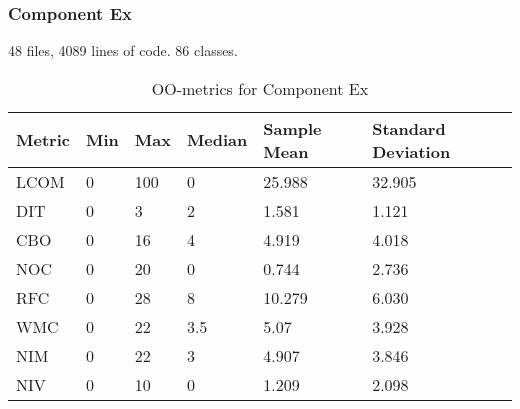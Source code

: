 \subsubsection{Component Ex}
48 files, 4089 lines of code. 86 classes.
\begin{table}[]
\centering
\caption{OO-metrics for Component Ex}
\label{tab:oometrics-ex}
\begin{tabular}{|l|l|l|l|l|l|}
\hline
\textbf{Metric} & \textbf{Min} & \textbf{Max} & \textbf{Median} & \textbf{Sample Mean} & \textbf{Standard Deviation} \\ \hline
LCOM            & 0           & 100          & 0               & 25.988               & 32.905                      \\ \hline
DIT             & 0            & 3            & 2               & 1.581                & 1.121                       \\ \hline
CBO             & 0            & 16           & 4               & 4.919                & 4.018                       \\ \hline
NOC             & 0            & 20           & 0               & 0.744                & 2.736                       \\ \hline
RFC             & 0            & 28           & 8               & 10.279               & 6.030                       \\ \hline
WMC             & 0            & 22           & 3.5             & 5.07                 & 3.928                       \\ \hline
NIM             & 0            & 22           & 3               & 4.907                & 3.846                       \\ \hline
NIV             & 0            & 10           & 0               & 1.209                & 2.098                       \\ \hline
\end{tabular}
\end{table}







